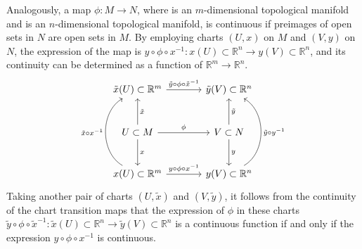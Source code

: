 Analogously, a map \(\phi : M \to N\), where  is an \(m\)-dimensional topological manifold and  is an \(n\)-dimensional topological manifold, is continuous if preimages of open sets in \(N\) are open sets in \(M\). By employing charts \((U, x)\) on \(M\) and \((V, y)\) on \(N\), the expression of the map is \(y \circ \phi \circ x^{-1} : x(U) \subset \mathbb{R}^n \to y(V) \subset \mathbb{R}^n\), and its continuity can be determined as a function of \(\mathbb{R}^m \to \mathbb{R}^n\).
\begin{equation*}
    \begin{tikzcd}[column sep = large, row sep = large]
        \tilde{x}(U) \subset \mathbb{R}^m \arrow{r}{\tilde{y}\circ \phi \circ \tilde{x}^{-1}} & \tilde{y}(V) \subset \mathbb{R}^n\\
        U \subset M \arrow{d}{x} \arrow[swap]{u}{\tilde{x}} \arrow{r}{\phi} & V \subset N \arrow{d}{y} \arrow[swap]{u}{\tilde{y}}\\
        x(U) \subset \mathbb{R}^m \arrow{r}{y\circ \phi \circ x^{-1}} \arrow[bend left=60]{uu}{\tilde{x} \circ x^{-1}} & y(V) \subset \mathbb{R}^n \arrow[bend right=60, swap]{uu}{\tilde{y}\circ y^{-1}}
    \end{tikzcd}
\end{equation*}
Taking another pair of charts \((U, \tilde{x})\) and \((V, \tilde{y})\), it follows from the continuity of the chart transition maps that the expression of \(\phi\) in these charts \(\tilde{y} \circ \phi \circ \tilde{x}^{-1} : \tilde{x}(U) \subset \mathbb{R}^n \to \tilde{y}(V) \subset \mathbb{R}^n\) is a continuous function if and only if the expression \(y \circ \phi\circ{x}^{-1}\) is continuous.
